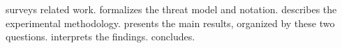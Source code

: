  surveys related work.
 formalizes the threat model and notation.
 describes the experimental methodology.
 presents the main results, organized by these two questions.
 interprets the findings.
 concludes.
